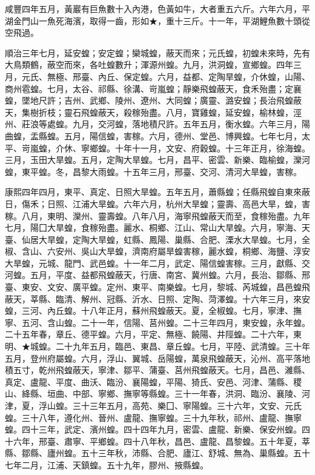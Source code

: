 \begin{pinyinscope}
咸豐四年五月，黃巖有巨魚數十入內港，色黃如牛，大者重五六斤。六年六月，平湖金門山一魚死海濱，取得一齒，形如★，重十三斤。十一年，平湖鯉魚數十頭從空飛過。

順治三年七月，延安蝗；安定蝗；欒城蝗，蔽天而來；元氏蝗，初蝗未來時，先有大鳥類鶴，蔽空而來，各吐蝗數升；渾源州蝗。九月，洪洞蝗，宣鄉蝗。四年三月，元氏、無極、邢臺、內丘、保定蝗。六月，益都、定陶旱蝗，介休蝗，山陽、商州雹蝗。七月，太谷、祁縣、徐溝、岢嵐蝗；靜樂飛蝗蔽天，食禾殆盡；定襄蝗，墜地尺許；吉州、武鄉、陵州、遼州、大同蝗；廣靈、潞安蝗；長治飛蝗蔽天，集樹折枝；靈石飛蝗蔽天，殺稼殆盡。八月，寶雞蝗，延安蝗，榆林蝗，涇州、莊浪等處蝗。九月，交河蝗，落地積尺許。五年五月，衡水蝗。六年三月，陽曲蝗，盂縣蝗。五月，陽信蝗，害稼。六月，德州、堂邑、博興蝗。七年七月，太平、岢嵐蝗，介休、寧鄉蝗。十年十一月，文安、府穀蝗。十三年正月，徐海蝗。三月，玉田大旱蝗。五月，定陶大旱蝗。七月，昌平、密雲、新樂、臨榆蝗，灤河蝗，東平蝗。冬，昌黎大雨蝗。十五年三月，邢臺、交河、清河大旱蝗，害稼。

康熙四年四月，東平、真定、日照大旱蝗。五年五月，蕭縣蝗；任縣飛蝗自東來蔽日，傷禾；日照、江浦大旱蝗。六年六月，杭州大旱蝗；靈壽、高邑大旱，蝗，害稼。八月，東明、灤州、靈壽蝗。八年八月，海寧飛蝗蔽天而至，食稼殆盡。九年七月，陽囗大旱蝗，食稼殆盡。麗水、桐鄉、江山、常山大旱蝗。六月，寧海、天臺、仙居大旱蝗，定陶大旱蝗，虹縣、鳳陽、巢縣、合肥、溧水大旱蝗。七月，全椒、含山、六安州、吳山大旱蝗，濟南府屬旱蝗害稼，麗水蝗，桐鄉、海鹽、淳安大旱蝗，元城、龍門、武邑蝗。十一年二月，武定、陽信蝗害稼。三月，獻縣、交河蝗。五月，平度、益都飛蝗蔽天，行唐、南宮、冀州蝗。六月，長治、鄒縣、邢臺、東安、文安、廣平蝗。定州、東平、南樂蝗。七月，黎城、芮城蝗，昌邑蝗飛蔽天，莘縣、臨清、解州、冠縣、沂水、日照、定陶、菏澤蝗。十六年三月，來安蝗，三河、內丘蝗。十八年正月，蘇州飛蝗蔽天。夏，全椒蝗。七月，寧津、撫寧、五河、含山蝗。二十一年，信陽、莒州蝗。二十三年四月，東安蝗，永年蝗。二十五年春，章丘、德平蝗。六月，平定、無極、饒陽、井陘蝗。二十六年，東明、★城蝗。二十九年五月，臨邑、東昌、章丘蝗。七月，平陸、武清蝗。三十年五月，登州府屬蝗。六月，浮山、翼城、岳陽蝗，萬泉飛蝗蔽天，沁州、高平落地積五寸，乾州飛蝗蔽天，寧津、鄒平、蒲臺、莒州飛蝗蔽天。七月，昌邑、濰縣、真定、盧龍、平度、曲沃、臨汾、襄陽蝗，平陽、猗氏、安邑、河津、蒲縣、稷山、絳縣、垣曲、中部、寧鄉、撫寧等縣蝗。三十一年春，洪洞、臨汾、襄陵、河津，夏，浮山蝗。三十三年五月，高苑、樂囗、寧陽蝗。三十六年，文安、元氏蝗。三十八年，遵化州、晉州、盧龍、撫寧蝗。三十九年秋，祁州、盧龍、撫寧蝗。四十三年，武定、濱州蝗。四十四年九月，密雲、盧龍、新樂、保安州蝗。四十六年，邢臺、肅寧、平鄉蝗。四十八年秋，昌邑、盧龍、昌黎蝗。五十年夏，莘縣、鄒縣、廬州蝗。五十三年秋，沛縣、合肥、廬江、舒城、無為、巢縣蝗。五十七年二月，江浦、天鎮蝗。五十九年，膠州、掖縣蝗。


\end{pinyinscope}

